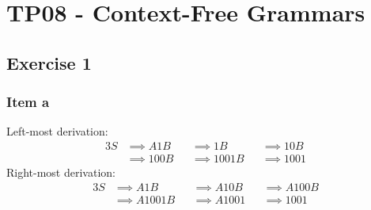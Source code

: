 \setcounter{section}{7}
\section{TP08 - Context-Free Grammars}
{
\renewcommand{\thesubsubsection}{\thesubsection\alph{subsubsection}}
\subsection{Exercise 1}
\subsubsection{Item a}
\begin{minipage}[b]{0.6\textwidth}
	Left-most derivation:
	\begin{alignat*}{3}
		S &\implies A1B  &&\implies 1B    &&\implies 10B \\
		  &\implies 100B &&\implies 1001B &&\implies 1001
	\end{alignat*}
	Right-most derivation:
	\begin{alignat*}{3}
		S &\implies A1B    &&\implies A10B  &&\implies A100B \\
		  &\implies A1001B &&\implies A1001 &&\implies 1001
	\end{alignat*}
\end{minipage}
\begin{minipage}[c]{0.35\textwidth}
	\begin{center}
	\end{center}
\end{minipage}
}
